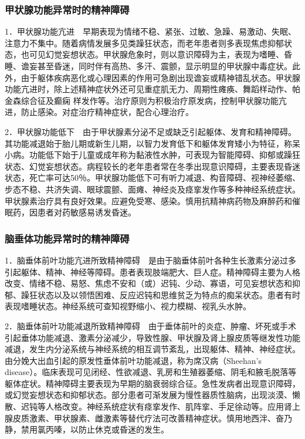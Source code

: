 \subsubsection{甲状腺功能异常时的精神障碍}

1．甲状腺功能亢进　早期表现为情绪不稳、紧张、过敏、急躁、易激动、失眠、注意力不集中。随着病情发展多见类躁狂状态，而老年患者则多表现焦虑抑郁状态，也可见幻觉妄想状态。甲状腺危象时，则以意识障碍为主，表现为嗜睡、昏睡、谵妄甚至昏迷，同时伴有高热、多汗、震颤，显示明显的甲状腺中毒症状。此外，由于躯体疾病恶化或心理因素的作用可急剧出现谵妄或精神错乱状态。甲状腺功能亢进时，除上述精神症状外还可见重症肌无力、周期性瘫痪、舞蹈样动作、帕金森综合征及癫痫
样发作等。治疗原则为积极治疗原发病，控制甲状腺功能亢进，防止感染。对症治疗精神症状，配合心理治疗。

2．甲状腺功能低下　由于甲状腺素分泌不足或缺乏引起躯体、发育和精神障碍。其功能减退始于胎儿期或新生儿期，以智力发育低下和躯体发育矮小为特征，称呆小病。功能低下始于儿童或成年称为黏液性水肿，可表现为智能障碍、抑郁或躁狂状态、幻觉妄想状态。病程较长的老年患者常在冬季出现意识障碍，主要表现昏迷状态，死亡率可达50％。甲状腺功能低下可有听力减退、构音障碍、视神经萎缩、步态不稳、共济失调、眼球震颤、面瘫、神经炎及痉挛发作等多种神经系统症状。甲状腺素治疗具有良好效果。应避免受寒、感染。慎用抗精神病药物及麻醉药和催眠药，因患者对药敏感易诱发昏迷。

\subsubsection{脑垂体功能异常时的精神障碍}

1．脑垂体前叶功能亢进所致精神障碍　是由于脑垂体前叶各种生长激素分泌过多引起躯体、精神、神经等障碍。患者表现肢端肥大、巨人症。精神障碍主要为人格改变、情绪不稳、易怒、焦虑不安和（或）迟钝、少动、寡语，可见妄想状态和抑郁、躁狂状态以及以领悟困难、反应迟钝和思维贫乏为特点的痴呆状态。患者有时表现嗜睡状态。神经系统可查知视野缩小、视力模糊、视乳头水肿。

2．脑垂体前叶功能减退所致精神障碍　由于垂体前叶的炎症、肿瘤、坏死或手术引起垂体功能减退、激素分泌减少，导致性腺、甲状腺及肾上腺皮质等继发性功能减退，发生内分泌系统与神经系统的相互调节紊乱，出现躯体、精神、神经症状。由分娩大出血引起的原发性垂体前叶功能减退，称为席汉病（Sheehan's
disease）。临床表现可见闭经、性欲减退、乳房和生殖器萎缩、阴毛和腋毛脱落等躯体症状。精神障碍主要表现为早期的脑衰弱综合征。急性发病者出现意识障碍，或幻觉妄想状态和抑郁状态。部分患者可渐发展为慢性器质性脑病，出现淡漠、懒散、迟钝等人格改变。神经系统症状有痉挛发作、肌阵挛、手足徐动等。应用肾上腺皮质激素、甲状腺素、雌激素等替代疗法可改善精神症状。慎用地西泮、奋乃静，禁用氯丙嗪，以防止休克或昏迷的发生。

